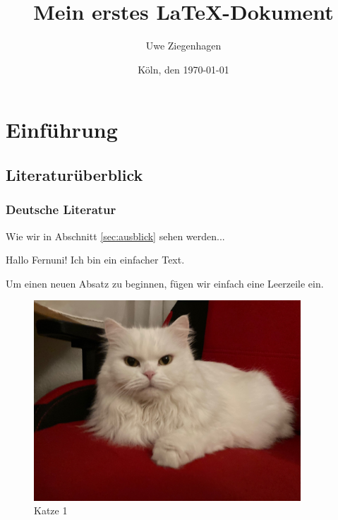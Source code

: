 \documentclass[12pt,ngerman,parskip=half]{scrartcl}
\author{Uwe Ziegenhagen}
\title{Mein erstes LaTeX-Dokument}
\date{Köln, den \today} %
\begin{document}
\maketitle

\tableofcontents

\listoffigures

\section{Einführung}
\subsection{Literaturüberblick}
\subsubsection{Deutsche Literatur}

Wie wir in Abschnitt \ref{sec:ausblick} sehen werden...

Hallo Fernuni!
Ich bin ein einfacher Text.

Um einen neuen Absatz zu beginnen, fügen wir einfach eine Leerzeile ein.



\begin{figure}[b] %
\begin{center}
\includegraphics[width=10cm]{Bilder/Katze}
\end{center}
\caption{Katze 1}\label{fig:katze}
\end{figure}

\blindtext[1]
\end{document}
